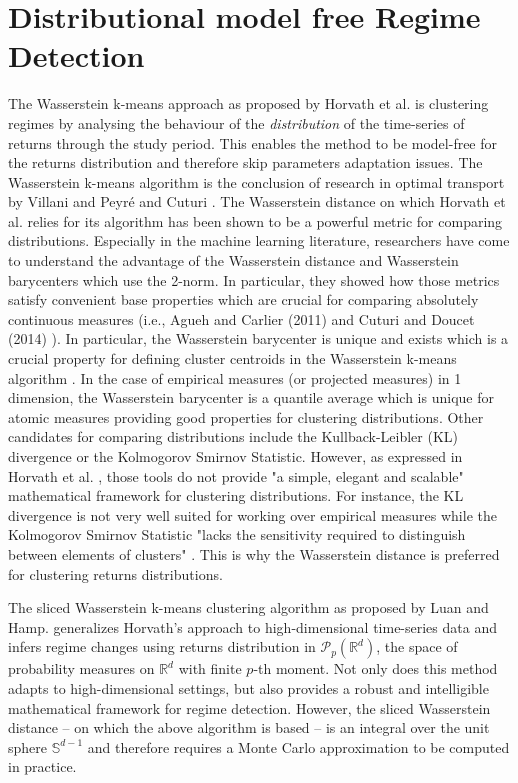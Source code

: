 \documentclass[12pt,a4paper]{report}
\begin{document}
\section{Distributional model free Regime Detection}
The Wasserstein k-means approach as proposed by Horvath et al. \cite{HorvathEtAl2024} is clustering regimes by analysing the behaviour of the \textit{distribution} of the time-series of returns through the study period.
This enables the method to be model-free for the returns distribution and therefore skip parameters adaptation issues.
The Wasserstein k-means algorithm is the conclusion of research in optimal transport by Villani \cite{Villani2009} and Peyré and Cuturi \cite{Peyré&Cuturi2019}. The Wasserstein distance on which Horvath et al. \cite{HorvathEtAl2024} relies for its algorithm has been shown to be a powerful metric for comparing distributions.
Especially in the machine learning literature, researchers have come to understand the advantage of the Wasserstein distance and Wasserstein barycenters which use the 2-norm. In particular, they showed how those metrics satisfy convenient base properties which are crucial for comparing absolutely continuous measures (i.e., Agueh and Carlier (2011) \cite{Agueh&Carlier2011} and Cuturi and Doucet (2014) \cite{Cuturi&Doucet2014}). In particular, the Wasserstein barycenter is unique and exists which is 
a crucial property for defining cluster centroids in the Wasserstein k-means algorithm \cite{Agueh&Carlier2011}. 
In the case of empirical measures (or projected measures) in 1 dimension, the Wasserstein barycenter is a quantile average which is unique for atomic measures providing good properties for clustering distributions. 
Other candidates for comparing distributions include the Kullback-Leibler (KL) divergence or the Kolmogorov Smirnov Statistic.
However, as expressed in Horvath et al. \cite{HorvathEtAl2024}, those tools do not provide "a simple, elegant and scalable" \cite{HorvathEtAl2024} mathematical framework for clustering distributions.
For instance, the KL divergence is not very well suited for working over empirical measures while the Kolmogorov Smirnov Statistic "lacks the sensitivity required to distinguish between elements of clusters" \cite{HorvathEtAl2024}.
This is why the Wasserstein distance is preferred for clustering returns distributions.

The sliced Wasserstein k-means clustering algorithm as proposed by Luan and Hamp. \cite{LuanHamp2025} generalizes Horvath's approach to high-dimensional time-series data and infers regime changes using returns distribution in $\mathcal{P}_p(\mathbb{R}^d)$, the space of probability measures on $\mathbb{R}^d$ with finite $p$-th moment.
Not only does this method adapts to high-dimensional settings, but also provides a robust and intelligible mathematical framework for regime detection.
However, the sliced Wasserstein distance -- on which the above algorithm is based -- is an integral over the unit sphere $\mathbb{S}^{d-1}$ and therefore requires a Monte Carlo approximation to be computed in practice. 
\end{document}
